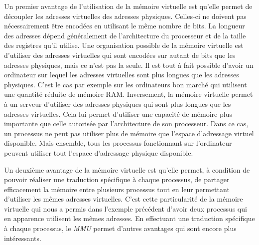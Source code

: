 Un premier avantage de l'utilisation de la mémoire virtuelle est
qu'elle permet de découpler les adresses virtuelles des adresses
physiques. Celles-ci ne doivent pas nécessairement être encodées en
utilisant le même nombre de bits. La longueur des adresses dépend
généralement de l'architecture du processeur et de la taille des
registres qu'il utilise. Une organisation possible de la mémoire
virtuelle est d'utiliser des adresses virtuelles qui sont encodées
sur autant de bits que les adresses physiques, mais ce n'est pas la
seule. Il est tout à fait possible d'avoir un ordinateur sur lequel
les adresses virtuelles sont plus longues que les adresses physiques.
C'est le cas par exemple sur les ordinateurs bon marché qui utilisent
une quantité réduite de mémoire RAM. Inversement, la mémoire
virtuelle permet à un serveur d'utiliser des adresses physiques qui
sont plus longues que les adresses virtuelles. Cela lui permet
d'utiliser une capacité de mémoire plus importante que celle
autorisée par l'architecture de son processeur. Dans ce cas, un
processus ne peut pas utiliser plus de mémoire que l'espace
d'adressage virtuel disponible. Mais ensemble, tous les processus
fonctionnant sur l'ordinateur peuvent utiliser tout l'espace
d'adressage physique disponible. \newline

Un deuxième avantage de la mémoire virtuelle est qu'elle permet, à
condition de pouvoir réaliser une traduction spécifique à chaque
processus, de partager efficacement la mémoire entre plusieurs
processus tout en leur permettant d'utiliser les mêmes adresses
virtuelles. C'est cette particularité de la mémoire virtuelle qui
nous a permis dans l'exemple précédent d'avoir deux processus qui en
apparence utilisent les mêmes adresses. En effectuant une traduction
spécifique à chaque processus, le \textit{MMU} permet d'autres
avantages qui sont encore plus intéressants.\newline
   
